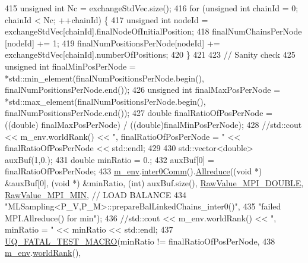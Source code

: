 \begin{DoxyCode}
415   \textcolor{keywordtype}{unsigned} \textcolor{keywordtype}{int} Nc = exchangeStdVec.size();
416   \textcolor{keywordflow}{for} (\textcolor{keywordtype}{unsigned} \textcolor{keywordtype}{int} chainId = 0; chainId < Nc; ++chainId) \{
417     \textcolor{keywordtype}{unsigned} \textcolor{keywordtype}{int} nodeId = exchangeStdVec[chainId].finalNodeOfInitialPosition;
418     finalNumChainsPerNode   [nodeId] += 1;
419     finalNumPositionsPerNode[nodeId] += exchangeStdVec[chainId].numberOfPositions;
420   \}
421 
423   \textcolor{comment}{// Sanity check}
425 \textcolor{comment}{}  \textcolor{keywordtype}{unsigned} \textcolor{keywordtype}{int} finalMinPosPerNode = *std::min\_element(finalNumPositionsPerNode.begin(), 
      finalNumPositionsPerNode.end());
426   \textcolor{keywordtype}{unsigned} \textcolor{keywordtype}{int} finalMaxPosPerNode = *std::max\_element(finalNumPositionsPerNode.begin(), 
      finalNumPositionsPerNode.end());
427   \textcolor{keywordtype}{double} finalRatioOfPosPerNode = ((double) finalMaxPosPerNode) / ((double)finalMinPosPerNode);
428   \textcolor{comment}{//std::cout << m\_env.worldRank() << ", finalRatioOfPosPerNode = " << finalRatioOfPosPerNode << std::endl;}
429 
430   std::vector<double> auxBuf(1,0.);
431   \textcolor{keywordtype}{double} minRatio = 0.;
432   auxBuf[0] = finalRatioOfPosPerNode;
433   \hyperlink{class_q_u_e_s_o_1_1_m_l_sampling_a13f1ca4fe9f94822fe572a743eaced1d}{m\_env}.\hyperlink{class_q_u_e_s_o_1_1_base_environment_a689e4d140c74d495d97eb498714a4b82}{inter0Comm}().\hyperlink{class_q_u_e_s_o_1_1_mpi_comm_a72e137e60ef8060efb1ee5fc874fa4b8}{Allreduce}((\textcolor{keywordtype}{void} *) &auxBuf[0], (\textcolor{keywordtype}{void} *) &minRatio, (\textcolor{keywordtype}{int}) 
      auxBuf.size(), \hyperlink{_mpi_comm_8h_ad0f503bd9fecfe4e570ca3d15aaf2518}{RawValue\_MPI\_DOUBLE}, \hyperlink{_mpi_comm_8h_a8e30f42fdac116861205e83e2aa18042}{RawValue\_MPI\_MIN}, \textcolor{comment}{// LOAD BALANCE}
434                                \textcolor{stringliteral}{"MLSampling<P\_V,P\_M>::prepareBalLinkedChains\_inter0()"},
435                                \textcolor{stringliteral}{"failed MPI.Allreduce() for min"});
436   \textcolor{comment}{//std::cout << m\_env.worldRank() << ", minRatio = " << minRatio << std::endl;}
437   \hyperlink{_defines_8h_a56d63d18d0a6d45757de47fcc06f574d}{UQ\_FATAL\_TEST\_MACRO}(minRatio != finalRatioOfPosPerNode,
438                       \hyperlink{class_q_u_e_s_o_1_1_m_l_sampling_a13f1ca4fe9f94822fe572a743eaced1d}{m\_env}.\hyperlink{class_q_u_e_s_o_1_1_base_environment_a78b57112bbd0e6dd0e8afec00b40ffa7}{worldRank}(),

\end{DoxyCode}
